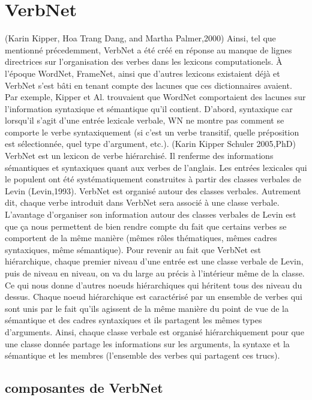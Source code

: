 \documentclass[12pt,maitrise,frenchb,natbib,twoside,initial]{dms}
\numberwithin{equation}{section}
\numberwithin{table}{chapter}
\numberwithin{figure}{chapter}
\begin{document}
\section{VerbNet}

(Karin Kipper, Hoa Trang Dang, and Martha Palmer,2000)
Ainsi, tel que mentionné précedemment, VerbNet a été créé en réponse au manque de lignes directrices sur l'organisation des verbes dans les  lexicons computationels. À l'époque WordNet, FrameNet, ainsi que d'autres lexicons existaient déjà et VerbNet s'est bâti en tenant compte des lacunes que ces dictionnaires avaient.  Par exemple, Kipper et Al. trouvaient que WordNet comportaient des lacunes sur l'information syntaxique et sémantique qu'il contient. D'abord, syntaxique car lorsqu'il s'agit d'une entrée lexicale verbale, WN ne montre pas comment se comporte le verbe syntaxiquement (si c'est un verbe transitif, quelle préposition est sélectionnée, quel type d'argument, etc.).
(Karin Kipper Schuler 2005,PhD)
VerbNet est un lexicon de verbe hiérarchisé. Il renferme des informations sémantiques et syntaxiques quant aux verbes de l'anglais. Les entrées lexicales qui le populent ont été systématiquement construites à partir des classes verbales de Levin (Levin,1993). VerbNet est organisé autour des classes verbales. Autrement dit, chaque verbe introduit dans VerbNet sera associé à une classe verbale. L'avantage d'organiser son information autour des classes verbales de Levin est que ça nous permettent de bien rendre compte du fait que certains verbes se comportent de la même manière (mêmes rôles thématiques, mêmes cadres syntaxiques, même sémantique). Pour revenir au fait que VerbNet est hiérarchique, chaque premier niveau d'une entrée est une classe verbale de Levin, puis de niveau en niveau, on va du large au précis à l'intérieur même de la classe. Ce qui nous donne d'autres noeuds hiérarchiques qui héritent tous des niveau du dessus. Chaque noeud hiérarchique est caractérisé par un ensemble de verbes qui sont unis par le fait qu'ils agissent de la même manière du point de vue de la sémantique et des cadres syntaxiques et ils partagent les mêmes types  d'arguments. Ainsi, chaque classe verbale est organisé hiérarchiquement pour que une classe donnée partage les informations sur les arguments, la syntaxe et la sémantique et les membres (l'ensemble des verbes qui partagent ces trucs).

\subsection {composantes de VerbNet}  
\end{document}
